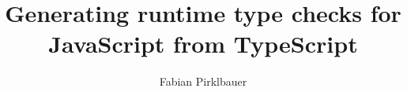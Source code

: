 \documentclass[master,english]{hgbthesis}
\title{Generating runtime type checks for JavaScript from TypeScript}
\author{Fabian Pirklbauer}
\begin{document}

\frontmatter

\maketitle
\tableofcontents


			

\mainmatter








\appendix 

% 

\MakeBibliography



\end{document}
